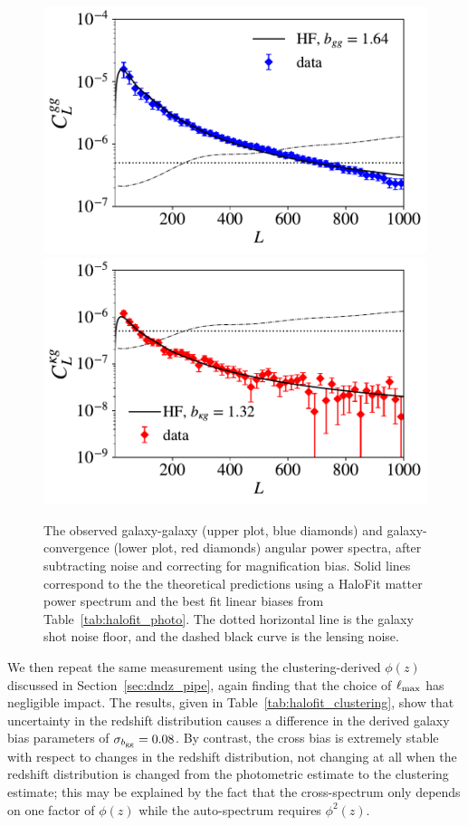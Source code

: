 \begin{figure}
\includegraphics[width=\linewidth]{figures/cl_gg_hf.pdf}
\includegraphics[width=\linewidth]{figures/cl_kg_hf.pdf}
\caption{The observed galaxy-galaxy (upper plot, blue diamonds) and galaxy-convergence (lower plot, red diamonds) angular power spectra, after subtracting noise and correcting for magnification bias. Solid lines correspond to the the theoretical predictions using a HaloFit matter power spectrum and the best fit linear biases from Table~\ref{tab:halofit_photo}. The dotted horizontal line is the galaxy shot noise floor, and the dashed black curve is the lensing noise.}
\label{fig:cl_halofit}
\end{figure}

We then repeat the same measurement using the clustering-derived $\phi(z)$ discussed in Section~\ref{sec:dndz_pipe}, again finding that the choice of $\ell_{\rm max}$ has negligible impact. The results, given in Table~\ref{tab:halofit_clustering}, show that uncertainty in the redshift distribution causes a difference in the derived galaxy bias parameters of $\sigma_{b_{\rm gg}} = 0.08$. By contrast, the cross bias is extremely stable with respect to changes in the redshift distribution, not changing at all when the redshift distribution is changed from the photometric estimate to the clustering estimate; this may be explained by the fact that the cross-spectrum only depends on one factor of $\phi(z)$ while the auto-spectrum requires $\phi^2(z)$.

